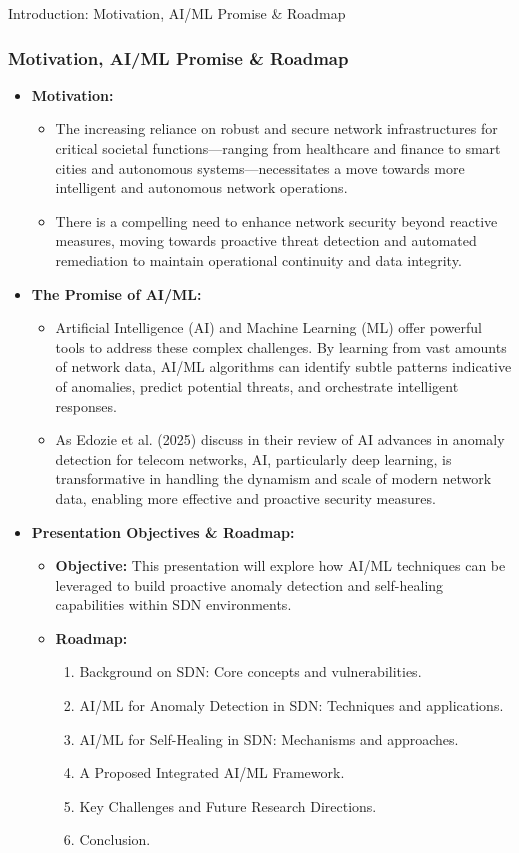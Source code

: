 \documentclass{beamer}
\begin{document}
\begin{frame}[shrink]{Introduction: Motivation, AI/ML Promise \& Roadmap}
  \frametitle{Motivation, AI/ML Promise \& Roadmap}
  \begin{itemize}
    \item \textbf{Motivation:}
    \begin{itemize}
        \item The increasing reliance on robust and secure network infrastructures for critical societal functions—ranging from healthcare and finance to smart cities and autonomous systems—necessitates a move towards more intelligent and autonomous network operations.
        \item There is a compelling need to enhance network security beyond reactive measures, moving towards proactive threat detection and automated remediation to maintain operational continuity and data integrity.
    \end{itemize}
    \item \textbf{The Promise of AI/ML:}
    \begin{itemize}
        \item Artificial Intelligence (AI) and Machine Learning (ML) offer powerful tools to address these complex challenges. By learning from vast amounts of network data, AI/ML algorithms can identify subtle patterns indicative of anomalies, predict potential threats, and orchestrate intelligent responses.
        \item As Edozie et al. (2025) discuss in their review of AI advances in anomaly detection for telecom networks, AI, particularly deep learning, is transformative in handling the dynamism and scale of modern network data, enabling more effective and proactive security measures.
    \end{itemize}
    \item \textbf{Presentation Objectives \& Roadmap:}
    \begin{itemize}
        \item \textbf{Objective:} This presentation will explore how AI/ML techniques can be leveraged to build proactive anomaly detection and self-healing capabilities within SDN environments.
        \item \textbf{Roadmap:}
        \begin{enumerate}
            \item Background on SDN: Core concepts and vulnerabilities.
            \item AI/ML for Anomaly Detection in SDN: Techniques and applications.
            \item AI/ML for Self-Healing in SDN: Mechanisms and approaches.
            \item A Proposed Integrated AI/ML Framework.
            \item Key Challenges and Future Research Directions.
            \item Conclusion.
        \end{enumerate}
    \end{itemize}
  \end{itemize}
\end{frame}
\end{document}
